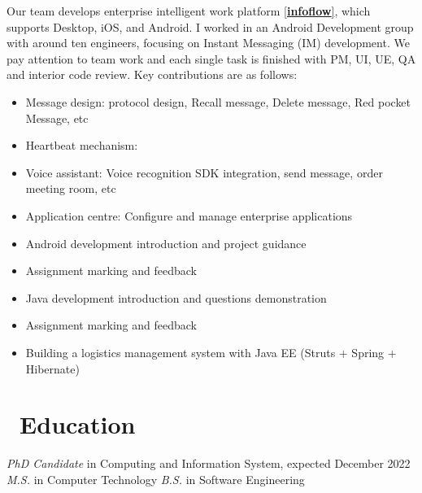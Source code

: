 \documentclass{resume}
\begin{document}
Our team develops enterprise intelligent work platform \href{https://infoflow.baidu.com/}{[\textbf{infoflow}]}, which supports Desktop, iOS, and Android. I worked in an Android Development group with around ten engineers, focusing on Instant Messaging (IM) development.  We pay attention to team work and each single task is finished with PM, UI, UE, QA and interior code review. Key contributions are as follows:
\begin{itemize}
  \item Message design: protocol design, Recall message, Delete message, Red pocket Message, etc
  \item Heartbeat mechanism:
  \item Voice assistant: Voice recognition SDK integration, send message, order meeting room, etc
  \item Application centre: Configure and manage enterprise applications
\end{itemize}

\begin{itemize}
  \item Android development introduction and project guidance
  \item Assignment marking and feedback
\end{itemize}

\begin{itemize}
  \item Java development introduction and questions demonstration
    \item Assignment marking and feedback
\end{itemize}


\begin{itemize}
  \item Building a logistics management system with Java EE  (Struts + Spring + Hibernate)
\end{itemize}


\section{\faGraduationCap\ Education}
\textit{PhD Candidate} in Computing and Information System, expected December 2022
\textit{M.S.} in Computer Technology
\textit{B.S.} in Software Engineering
  
\end{document}
